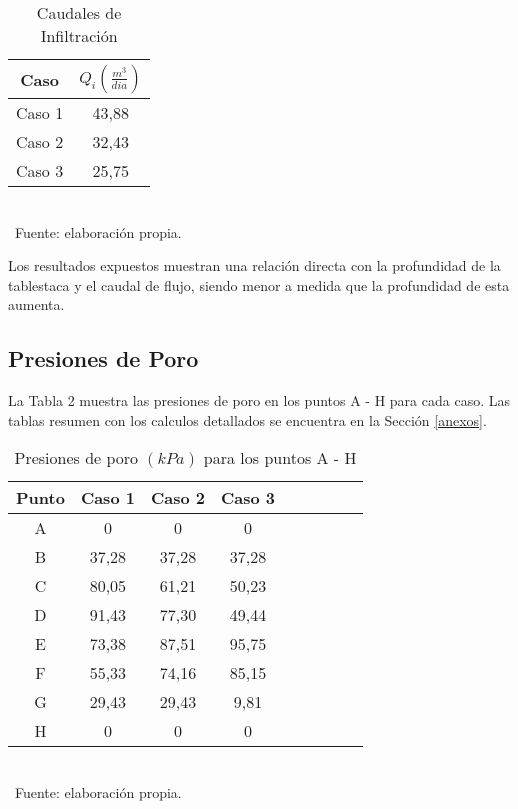\documentclass{article} %
\begin{document}
\begin{table}[h!]
    \centering
    \caption{Caudales de Infiltración}
    \begin{tabular}{|c|c|}
      \hline
      Caso & $Q_i (\frac{m^3}{dia})$ \\
      \hline
      Caso 1 & 43,88 \\
      \hline
      Caso 2 & 32,43 \\
      \hline
      Caso 3 & 25,75 \\
      \hline
    \end{tabular}
    \footnotesize \\\ Fuente: elaboración propia.
    \label{tab1}
\end{table}

Los resultados expuestos muestran una relación directa con la profundidad de la tablestaca y el caudal de flujo, siendo menor a medida que la profundidad de esta aumenta.

\newpage

\subsection{Presiones de Poro}

La Tabla 2 muestra las presiones de poro en los puntos A - H para cada caso. Las tablas resumen con los calculos detallados se encuentra en la Sección \ref{anexos}.

\begin{table}[h!]
    \centering
    \caption{Presiones de poro $(kPa)$ para los puntos A - H}
    \begin{tabular}{|c|c|c|c|c|c|c|c|c|}
      \hline
      Punto & Caso 1 & Caso 2 & Caso 3 \\
      \hline
      A & 0 & 0 & 0 \\
      \hline
      B & 37,28 & 37,28 & 37,28 \\
      \hline
      C & 80,05 & 61,21 & 50,23 \\
      \hline
      D & 91,43 & 77,30 & 49,44 \\
      \hline
      E & 73,38 & 87,51 & 95,75 \\
      \hline
      F & 55,33 & 74,16 & 85,15 \\
      \hline
      G & 29,43 & 29,43 & 9,81 \\
      \hline
      H & 0 & 0 & 0 \\
      \hline
    \end{tabular}
    \footnotesize \\\ Fuente: elaboración propia.
    \label{tab2}
\end{table}
\end{document}
